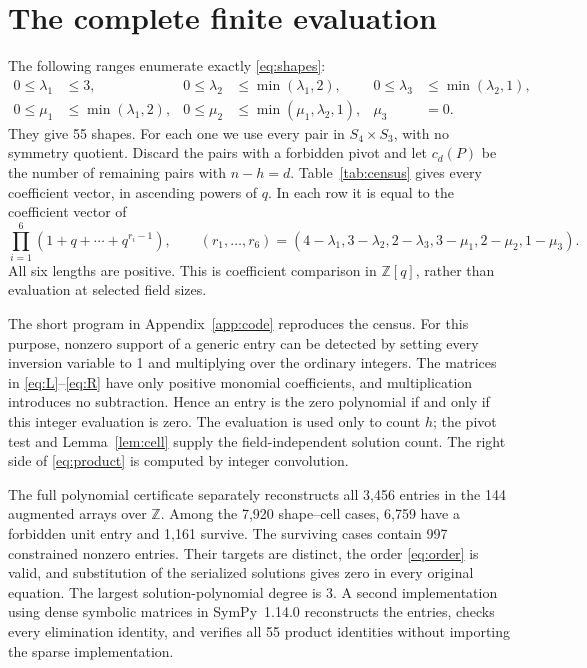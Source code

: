 \documentclass[11pt]{article}
\newcommand{\Z}{\mathbb Z}
\begin{document}
\section{The complete finite evaluation}

The following ranges enumerate exactly \eqref{eq:shapes}:
\begin{align*}
 0\leq\lambda_1&\leq3,&
 0\leq\lambda_2&\leq\min(\lambda_1,2),&
 0\leq\lambda_3&\leq\min(\lambda_2,1),\\
 0\leq\mu_1&\leq\min(\lambda_1,2),&
 0\leq\mu_2&\leq\min(\mu_1,\lambda_2,1),&\mu_3&=0.
\end{align*}
They give 55 shapes. For each one we use every pair in $S_4\times S_3$,
with no symmetry quotient. Discard the pairs with a forbidden pivot and
let $c_d(P)$ be the number of remaining pairs with $n-h=d$.
Table~\ref{tab:census} gives every coefficient vector, in ascending
powers of $q$. In each row it is equal to the coefficient vector of
\begin{equation}\label{eq:product}
 \prod_{i=1}^{6}(1+q+\cdots+q^{r_i-1}),\qquad
 (r_1,\ldots,r_6)=
 (4-\lambda_1,3-\lambda_2,2-\lambda_3,
  3-\mu_1,2-\mu_2,1-\mu_3).
\end{equation}
All six lengths are positive. This is coefficient comparison in
$\Z[q]$, rather than evaluation at selected field sizes.

The short program in Appendix~\ref{app:code} reproduces the census.
For this purpose, nonzero support of a generic entry can be detected
by setting every inversion variable to 1 and multiplying over the
ordinary integers. The matrices in \eqref{eq:L}--\eqref{eq:R} have
only positive monomial coefficients, and multiplication introduces
no subtraction. Hence an entry is the zero polynomial if and only if
this integer evaluation is zero. The evaluation is used only to count
$h$; the pivot test and Lemma~\ref{lem:cell} supply the field-independent
solution count. The right side of \eqref{eq:product} is computed by
integer convolution.

The full polynomial certificate separately reconstructs all 3,456
entries in the 144 augmented arrays over $\Z$. Among the 7,920
shape--cell cases, 6,759 have a forbidden unit entry and 1,161 survive.
The surviving cases contain 997 constrained nonzero entries. Their
targets are distinct, the order \eqref{eq:order} is valid, and
substitution of the serialized solutions gives zero in every original
equation. The largest solution-polynomial degree is 3. A second
implementation using dense symbolic matrices in SymPy~1.14.0
\cite{SymPy} reconstructs the entries, checks every elimination
identity, and verifies all 55 product identities without importing the
sparse implementation.
\end{document}
